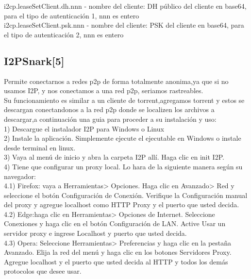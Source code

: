 \documentclass[12]{article}
\begin{document}
i2cp.leaseSetClient.dh.nnn - nombre del cliente: DH público del cliente en base64, para el tipo de autenticación 1, nnn es entero
\\

i2cp.leaseSetClient.psk.nnn - nombre del cliente: PSK del cliente en base64, para el tipo de autenticación 2, nnn es entero 
\subsection{I2PSnark[5]}
Permite conectarnos a redes p2p de forma totalmente anonima,ya que si no usamos I2P, y nos conectamos a una red p2p, seriamos rastreables.
\\

Su funcionamiento es similar a un cliente de torrent,agregamos torrent y estos se descargan conectandonos a la red p2p donde se localizen los archivos a descargar,a continuación 
una guia para proceder a su instalación y uso:
\\

1) Descargue el instalador I2P para Windows o Linux
\\

2) Instale la aplicación. Simplemente ejecute el ejecutable en Windows o instale desde terminal en linux.
\\

3) Vaya al menú de inicio y abra la carpeta I2P allí. Haga clic en init I2P.
\\

4) Tiene que configurar un proxy local. Lo hara de la siguiente manera según su navegador:
\\

4.1) Firefox: vaya a Herramientas> Opciones. Haga clic en Avanzado> Red y seleccione el botón Configuración de Conexión. Verifique la Configuración manual del proxy y agregue localhost como HTTP Proxy y el puerto que usted decida.
\\

4.2) Edge:haga clic en Herramientas> Opciones de Internet. Seleccione Conexiones  y haga clic en el botón Configuración de LAN. Active Usar un servidor proxy e ingrese Localhost y puerto que usted decida.
\\

4.3) Opera: Seleccione Herramientas> Preferencias y haga clic en la pestaña Avanzado. Elija la red del menú y haga clic en los botones Servidores Proxy. Agregue localhost y el puerto que usted decida al HTTP y todos los demás protocolos que desee usar.
\\
\end{document}
